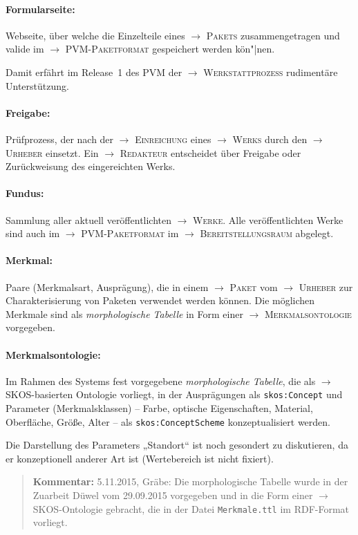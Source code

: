 \documentclass[a4paper,11pt]{article}
\newcommand{\Kommentar}[1]{
  \begin{quote}\textbf{Kommentar:} #1 \end{quote}
}
\newcommand{\glossar}[1]{{$\to$ \textsc{#1}}}
\begin{document}
\paragraph{Formularseite:} 
Webseite, über welche die Einzelteile eines \glossar{Pakets} zusammengetragen
und valide im \glossar{PVM-Paketformat} gespeichert werden kön"|nen.  

Damit erfährt im Release~1 des PVM der \glossar{Werkstattprozess} rudimentäre
Unterstützung.

\paragraph{Freigabe:} 
Prüfprozess, der nach der \glossar{Einreichung} eines \glossar{Werks} durch den
\glossar{Urheber} einsetzt. Ein \glossar{Redakteur} entscheidet über Freigabe
oder Zurückweisung des eingereichten {Werks}.

\paragraph{Fundus:} 
Sammlung aller aktuell veröffentlichten \glossar{Werke}.  Alle
veröffentlichten Werke sind auch im \glossar{PVM-Paketformat} im
\glossar{Bereitstellungsraum} abgelegt.

\paragraph{Merkmal:} 
Paare (Merkmalsart, Ausprägung), die in einem \glossar{Paket} vom
\glossar{Urheber} zur Charakterisierung von Paketen verwendet werden können.
Die möglichen Merkmale sind als \emph{morphologische Tabelle} in Form einer
\glossar{Merkmalsontologie} vorgegeben.

\paragraph{Merkmalsontologie:} 
Im Rahmen des Systems fest vorgegebene \emph{morphologische Tabelle}, die als
\glossar{SKOS}-basierten Ontologie vorliegt, in der Ausprägungen als
\texttt{skos:Concept} und Parameter (Merkmalsklassen) -- Farbe, optische
Eigenschaften, Material, Oberfläche, Größe, Alter -- als
\texttt{skos:ConceptScheme} konzeptualisiert werden.

Die Darstellung des Parameters „Standort“ ist noch gesondert zu diskutieren, da
er konzeptionell anderer Art ist (Wertebereich ist nicht fixiert).

\Kommentar{5.11.2015, Gräbe: Die morphologische Tabelle wurde in der Zuarbeit
  Düwel vom 29.09.2015 vorgegeben und in die Form einer
  \glossar{SKOS}-Ontologie gebracht, die in der Datei \texttt{Merkmale.ttl} im
  RDF-Format vorliegt. }
\end{document}
